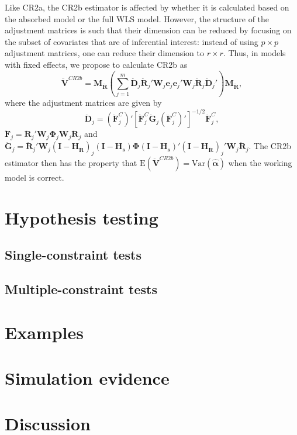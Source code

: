 \documentclass[12pt]{article}\usepackage[]{graphicx}\usepackage[]{color}
\newcommand{\E}{\text{E}}
\newcommand{\Var}{\text{Var}}
\newcommand{\bm}{\mathbf}
\newcommand{\bs}{\boldsymbol}
\begin{document}
Like CR2a, the CR2b estimator is affected by whether it is calculated based on the absorbed model or the full WLS model. However, the structure of the adjustment matrices is such that their dimension can be reduced by focusing on the subset of covariates that are of inferential interest: instead of using $p \times p$ adjustment matrices, one can reduce their dimension to $r \times r$. Thus, in models with fixed effects, we propose to calculate CR2b as 
\begin{equation}
\label{eq:V_CR2b_FE}
\bm{\ddot{V}}^{CR2b} = \bm{M_{\ddot{R}}} \left(\sum_{j=1}^m \bm{\ddot{D}}_j \bm{\ddot{R}}_j' \bm{W}_j \bm{e}_j \bm{e}_j' \bm{W}_j \bm{\ddot{R}}_j \bm{\ddot{D}}_j'\right) \bm{M_{\ddot{R}}},
\end{equation}
where the adjustment matrices are given by 
\begin{equation}
\bm{\ddot{D}}_j = \left(\bm{\ddot{F}}_j^C\right)'\left[\bm{\ddot{F}}_j^C \bm{\ddot{G}}_j \left(\bm{\ddot{F}}_j^C\right)'\right]^{-1/2}\bm{\ddot{F}}_j^C,
\end{equation}
$\bm{\ddot{F}}_j = \bm{\ddot{R}}_j' \bm{W}_j \bs\Phi_j \bm{W}_j \bm{\ddot{R}}_j$ and $\bm{\ddot{G}}_j = \bm{\ddot{R}}_j' \bm{W}_j \left(\bm{I} - \bm{H_{\ddot{R}}}\right)_j  \left(\bm{I} - \bm{H_s}\right) \bs\Phi \left(\bm{I} - \bm{H_s}\right)' \left(\bm{I} - \bm{H_{\ddot{R}}}\right)_j' \bm{W}_j \bm{\ddot{R}}_j$. The CR2b estimator then has the property that $\E\left(\bm{\ddot{V}}^{CR2b}\right) = \Var\left(\bs{\hat\alpha}\right)$ when the working model is correct.


\section{Hypothesis testing}
\label{sec:testing}

\subsection{Single-constraint tests}

\subsection{Multiple-constraint tests}

\section{Examples}
\label{sec:examples}

\section{Simulation evidence}
\label{sec:simulations}

\section{Discussion}
\label{sec:discussion}



\end{document}
